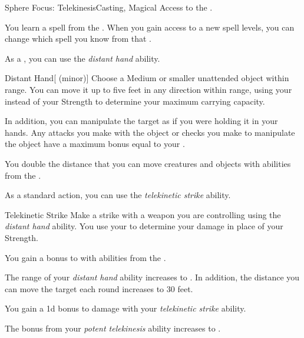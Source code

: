     \begin{feat}{Sphere Focus: Telekinesis}{Casting, Magical}
        \featpre Access to the  .

         You learn a spell from the  .
        When you gain access to a new spell levels, you can change which spell you know from that .

         As a , you can use the \textit{distant hand} ability.
        \begin{ability}{Distant Hand}[ (minor)]
            Choose a Medium or smaller unattended object within \rngclose range.
            You can move it up to five feet in any direction within range, using your  instead of your Strength to determine your maximum carrying capacity.

            In addition, you can manipulate the target as if you were holding it in your hands.
            Any attacks you make with the object or checks you make to manipulate the object have a maximum bonus equal to your .
        \end{ability}

         You double the distance that you can move creatures and objects with abilities from the  .

         As a standard action, you can use the \textit{telekinetic strike} ability.
        \begin{ability}{Telekinetic Strike}
            Make a strike with a weapon you are controlling using the \textit{distant hand} ability.
            You use your  to determine your damage in place of your Strength.
        \end{ability}

         You gain a  bonus to  with abilities from the  . 

         The range of your \textit{distant hand} ability increases to \rngmed.
        In addition, the distance you can move the target each round increases to 30 feet.

         You gain a \plus1d bonus to damage with your \textit{telekinetic strike} ability.

         The bonus from your \textit{potent telekinesis} ability increases to .
    \end{feat}

